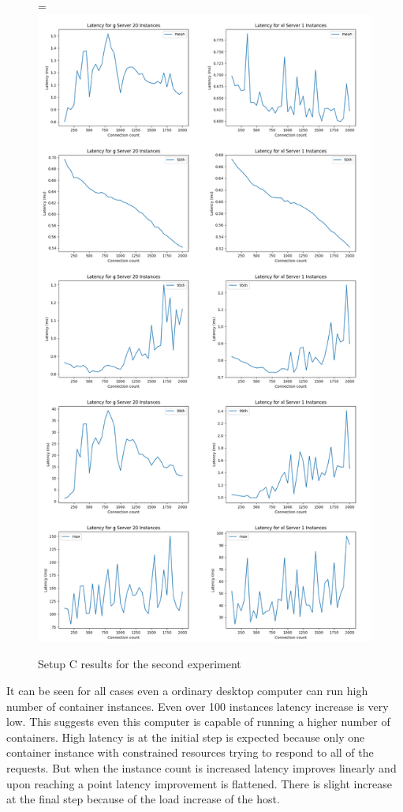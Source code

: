 \documentclass[12pt,oneandhalf,chaparabic,ceng,ms,eng,oneside,pntc]{gsufbe}
\makeatletter
\let\old@includegraphics\includegraphics
\renewcommand{\includegraphics}[2][,]{%
  \setbox9=\hbox{\old@includegraphics[#1]{#2}}%
  \ifdim\wd9>\textwidth
    \old@includegraphics[#1,width=\textwidth]{#2}%
  \else
    \old@includegraphics[#1]{#2}%
  \fi%
}
\makeatother
\begin{document}
\begin{figure}
\centering
\includegraphics[]{1vs20.png}
\caption{Setup C results for the second experiment}
\label{fig:1vs20}
\end{figure}

It can be seen for all cases even a ordinary desktop computer can run high number of container
instances.  Even over 100 instances latency increase is very low.  This suggests even this computer is
capable of running a higher number of containers.  High latency is at the initial step is expected 
because only one container instance with constrained resources trying to respond to all of the requests.
But when
the instance count is increased latency improves linearly and upon reaching a point latency improvement
is flattened.  There is slight increase at the final step because of the load increase of the host.
\end{document}

